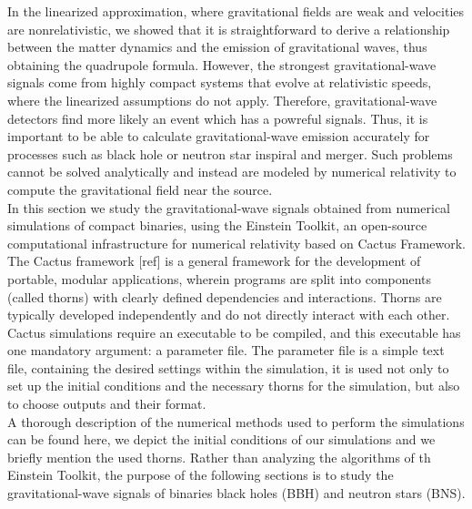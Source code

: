 
In the linearized approximation, where gravitational fields are weak and velocities are nonrelativistic, we showed that it is straightforward to derive a relationship between the matter dynamics and the emission of gravitational waves, thus obtaining the quadrupole formula.
However, the strongest gravitational-wave signals come from highly compact systems that evolve at relativistic speeds, where the linearized assumptions do not apply. 
Therefore, gravitational-wave detectors find more likely an event which has a powreful signals.
Thus, it is important to be able to calculate gravitational-wave emission accurately for processes such as black hole or neutron star inspiral and merger.
Such problems cannot be solved analytically and instead are modeled by numerical relativity to compute the gravitational field near the source.\\
In this section we study the gravitational-wave signals obtained from numerical simulations of compact binaries, using the Einstein Toolkit, an open-source computational infrastructure for numerical relativity based on Cactus Framework.\\
The Cactus framework [ref] is a general framework for the development of portable, modular applications, wherein programs are split into components (called thorns) with clearly defined dependencies and interactions. 
Thorns are typically developed independently and do not directly interact with each other. 
Cactus simulations require an executable to be compiled, and this executable has one mandatory argument: a parameter file.
The parameter file is a simple text file, containing the desired settings within the simulation, it is used not only to set up the initial conditions and the necessary thorns for the simulation, but also to choose outputs and their format.
\\
A thorough description of the numerical methods used to perform the simulations can be found here, we depict the initial conditions of our simulations and we briefly mention the used thorns.
Rather than analyzing the algorithms of th Einstein Toolkit, the purpose of the following sections is to study the gravitational-wave signals of binaries black holes (BBH) and neutron stars (BNS).\\ 
